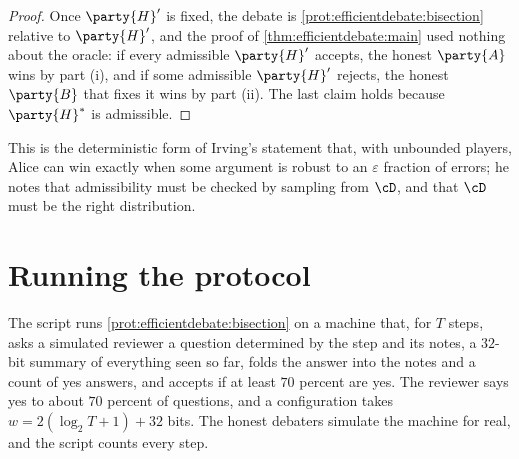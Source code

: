 \begin{refsection}
\begin{proof}
Once $\party{H}'$ is fixed, the debate is \cref{prot:efficientdebate:bisection} relative to $\party{H}'$, and the proof of \cref{thm:efficientdebate:main} used nothing about the oracle: if every admissible $\party{H}'$ accepts, the honest $\party{A}$ wins by part (i), and if some admissible $\party{H}'$ rejects, the honest $\party{B}$ that fixes it wins by part (ii). The last claim holds because $\party{H}^*$ is admissible.
\end{proof}

This is the deterministic form of Irving's statement that, with unbounded players, Alice can win exactly when some argument is robust to an $\varepsilon$ fraction of errors; he notes that admissibility must be checked by sampling from $\cD$, and that $\cD$ must be the right distribution.

\section{Running the protocol}\label{sec:efficientdebate:running}

The script  runs \cref{prot:efficientdebate:bisection} on a machine that, for $T$ steps, asks a simulated reviewer a question determined by the step and its notes, a $32$-bit summary of everything seen so far, folds the answer into the notes and a count of yes answers, and accepts if at least $70$ percent are yes. The reviewer says yes to about $70$ percent of questions, and a configuration takes $w=2(\log_2T+1)+32$ bits. The honest debaters simulate the machine for real, and the script counts every step.


\end{refsection}
